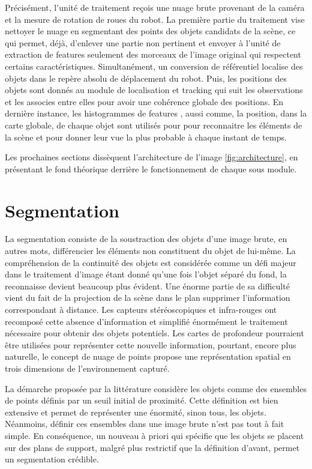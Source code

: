 Précisément, l'unité de traitement reçois une nuage brute provenant de la caméra et la mesure de rotation de roues du robot. La première partie du traitement vise nettoyer le nuage en segmentant des points des objets candidats de la scène, ce qui permet, déjà, d'enlever une partie non pertinent et envoyer à l'unité de extraction de features seulement des morceaux de l'image original qui respectent certains caractéristiques. Simultanément, un conversion de référentiel localise des objets dans le repère absolu de déplacement du robot. Puis, les positions des objets sont donnés au module de localisation et tracking qui suit les observations et les associes entre elles pour avoir une cohérence globale des positions. En dernière instance, les histogrammes de features , aussi comme, la position, dans la carte globale, de chaque objet sont utilisés pour pour reconnaitre les éléments de la scène et pour donner leur vue la plus probable à chaque instant de temps. 

Les prochaines sections dissèquent l'architecture de l'image \ref{fig:architecture}, en présentant le fond théorique derrière le fonctionnement de chaque sous module.

\section{Segmentation}

La segmentation consiste de la soustraction des objets d'une image brute, en autres mots, différencier les éléments non constituent du objet de lui-même. La compréhension de la continuité des objets est considérée comme un défi majeur dans le traitement d'image étant donné qu'une fois l'objet séparé du fond, la reconnaisse devient beaucoup plus évident. Une énorme partie de sa difficulté vient du fait de la projection de la scène dans le plan supprimer l'information
correspondant à distance. Les capteurs stéréoscopiques et infra-rouges ont recomposé cette absence d'information et simplifié énormément le traitement nécessaire pour obtenir des objets potentiels. Les cartes de profondeur pourraient être utilisées pour représenter cette nouvelle information, pourtant, encore plus naturelle, le concept de nuage de points propose une représentation spatial en trois dimensions de l'environnement capturé.

La démarche proposée par la littérature considère les objets comme des
ensembles de points définis par un seuil initial de proximité. Cette
définition est bien extensive et permet de représenter une énormité,
sinon tous, les objets. Néanmoins, définir ces ensembles dans une
image brute n'est pas tout à fait simple. En conséquence, un nouveau à
priori qui spécifie que les objets se placent sur des plans de
support, malgré plus restrictif que la définition d'avant, permet un
segmentation crédible.

